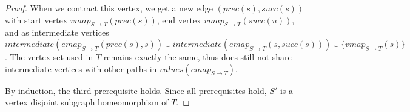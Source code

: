 \begin{proof}
When we contract this vertex, we get a new edge $(\mathit{prec}(s), \mathit{succ}(s))$ with start vertex $\mathit{vmap}_{S \to T}(\mathit{prec}(s))$, end vertex $\mathit{vmap}_{S \to T}(\mathit{succ}(u))$, and as intermediate vertices \newline$\mathit{intermediate}(\mathit{emap}_{S \to T}(\mathit{prec}(s), s)) \cup \mathit{intermediate}(\mathit{emap}_{S \to T}(s, \mathit{succ}(s))) \cup \{\mathit{vmap}_{S \to T}(s)\}$. The vertex set used in $T$ remains exactly the same, thus does still not share intermediate vertices with other paths in $\mathit{values}(\mathit{emap}_{S \to T})$.
 
By induction, the third prerequisite holds. Since all prerequisites hold, $S'$ is a vertex disjoint subgraph homeomorphism of $T$.


%
%
%
%
\end{proof} 